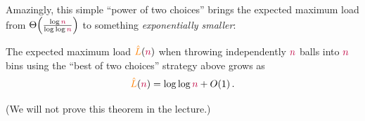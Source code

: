 \noindent Amazingly, this simple ``power of two choices'' brings the expected maximum load from $\bigTheta{\frac{\log\nbins}{\log\log\nbins}}$ to something \emph{exponentially smaller}:
\begin{theorem}
    \label{theo:maxload:twochoices}
    The expected maximum load $\textcolor{orange}{\hat{L}}(\textcolor{purple}{n})$ when throwing independently $\textcolor{purple}{n}$ balls into $\textcolor{purple}{n}$ bins using the ``best of two choices'' strategy above grows as
    \[
        \textcolor{orange}{\hat{L}}(\textcolor{purple}{n}) = \log\log\textcolor{purple}{n} + O(1)\,.
    \]
\end{theorem}
\noindent(We will not prove this theorem in the lecture.)